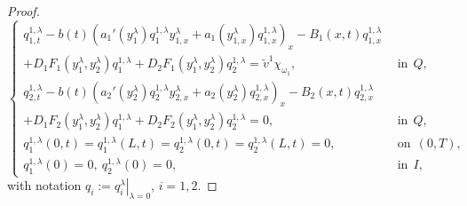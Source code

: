 \documentclass[11pt,a4paper]{amsart}
\numberwithin{equation}{section}
\begin{document}
\begin{proof}
\begin{equation}\label{qlambda}
    	\begin{cases}
    		q^{1,\lambda}_{1,t}-b(t)\left(a_1'(y^\lambda_{1}) q^{1,\lambda}_{1} y^\lambda_{1,x} + a_1(y^\lambda_{1,x})q^{1,\lambda}_{1,x}\right)_x-B_1(x,t) q^{1,\lambda}_{1,x}\\
             +D_1 F_1(y_1^\lambda,y_2^\lambda)q^{1,\lambda}_1+ D_2 F_1(y_1^\lambda,y_2^\lambda)q^{1,\lambda}_2=\widetilde{v}^1\chi_{\omega_1}, & \ \ \text{in} \ \ {Q}, \\
    		q^{1,\lambda}_{2,t}-b(t)\left( a_2'(y^\lambda_{2}) q^{1,\lambda}_{2} y^\lambda_{2,x} + a_2(y^\lambda_{2})q^{1,\lambda}_{2,x}\right)_x-B_2(x,t) q^{1,\lambda}_{2,x}\\
            +D_1 F_2(y_1^\lambda,y_2^\lambda) q^{1,\lambda}_1+ D_2 F_2(y_1^\lambda,y_2^\lambda)q^{1,\lambda}_2=0, &\ \ \text{in} \ \ {Q},\\
    		q^{1,\lambda}_1(0,t)=q^{1,\lambda}_1(L,t)=q^{1,\lambda}_2(0,t)=q^{1,\lambda}_2(L,t)=0, & \ \ \text{on} \ \ (0,T),\\
    		q^{1,\lambda}_1(0)=0, \ q^{1,\lambda}_2(0)=0, & \ \ \text{in} \ \ I,
    	\end{cases}
    \end{equation}with  notation  $q_i:=\left. q_i^\lambda\right|_{\lambda=0}$, $i=1, 2$.


\end{proof}
\end{document}
